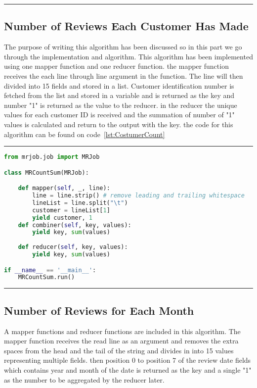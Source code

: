 \rule{200 pt}{0.5 pt} 


\subsection{Number of Reviews Each Customer Has Made}
The purpose of writing this algorithm has been discussed so in this part we go through the implementation and algorithm. This algorithm has been implemented using one mapper function and one reducer function. the mapper function receives the each line through line argument in the function. The line will then divided into 15 fields and stored in a list. Customer identification number is fetched from the list and stored in a variable and is returned as the key and number "1" is returned as the value to the reducer. in the reducer the unique values for each customer ID is received and the summation of number of "1" values is calculated and return to the output with the key. the code for this algorithm can be found on code~\ref{lst:CostumerCount} 

\rule{200 pt}{0.5 pt} 

\renewcommand{\lstlistingname}{Code}
\lstset{style=mystyle}
\begin{lstlisting}[language=Python, caption={Number of Reviews Each Customer Has Made}, label={lst:CostumerCount}, mathescape = true, breaklines=true]
from mrjob.job import MRJob

class MRCountSum(MRJob):

    def mapper(self, _, line):
        line = line.strip() # remove leading and trailing whitespace
        lineList = line.split("\t")
        customer = lineList[1]
        yield customer, 1
    def combiner(self, key, values):
        yield key, sum(values)
        
    def reducer(self, key, values):
        yield key, sum(values)

if __name__ == '__main__':
    MRCountSum.run()
\end{lstlisting}

\rule{200 pt}{0.5 pt} 

\subsection{Number of Reviews for Each Month}
A mapper functions and reducer functions are included in this algorithm. The mapper function receives the read line as an argument and removes the extra spaces from the head and the tail of the string and divides in into 15 values representing multiple fields. then position 0 to position 7 of the review date fields which contains year and month of the date is returned as the key and a single "1" as the number to be aggregated by the reducer later.

